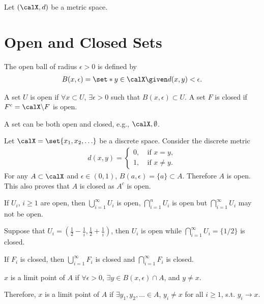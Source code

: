 \documentclass[../aipt.tex]{subfiles}
\begin{document}

Let $(\calX, d)$ be a metric space. 

\section{Open and Closed Sets}
\begin{Definition}
The open ball of radius $\epsilon > 0$ is defined by
\begin{align*}
B(x,\epsilon)=\set*{y \in \calX \given d(x,y)<\epsilon}.
\end{align*}
\end{Definition}

\begin{Definition}
A set $U$ is open if $\forall x \subset U$, $\exists \epsilon >0$ such that $B(x,\epsilon)\subset U$. A set $F$ is closed if $F^c = \calX\backslash F$ is open.
\end{Definition}

A set can be both open and closed, e.g., $\calX, \emptyset$. 

\begin{Example}\label{ex:discrete_X}
Let $\calX=\set{x_1, x_2, \ldots}$ be a discrete space. Consider the discrete metric
\begin{align*}
d(x,y)=\left\{
\begin{array}{ll}
0,&\ \text{if $x=y$}, \\
1,&\ \text{if $x\neq y$}.  
\end{array}\right.
\end{align*}
For any $A \subset \calX$ and $\epsilon\in(0,1)$, $B(a,\epsilon)=\{a\} \subset A$. Therefore $A$ is open. This also proves that $A$ is closed as $A^c$ is open. 
\end{Example}

If $U_i$, $i\geq1$ are open, then $\bigcup_{i=1}^\infty U_i$ is open, $\bigcap_{i=1}^n U_i$ is open but $\bigcap_{i=1}^\infty U_i$ may not be open.

\begin{Example}
Suppose that $U_i=(\frac{1}{2}-\frac{1}{i},\frac{1}{2}+\frac{1}{i})$, then $U_i$ is open while $\bigcap_{i=1}^\infty U_i=\{1/2\}$ is closed.
\end{Example}

If $F_i$ is closed, then $\bigcup_{i=1}^\infty F_i$ is closed and $\bigcap_{i=1}^\infty F_i$ is closed.

\begin{Definition}
$x$ is a limit point of $A$ if $\forall \epsilon >0$, $\exists y \in B(x,\epsilon) \cap A$, and $y\neq x$.
\end{Definition}
Therefore, $x$ is a limit point of $A$ if $\exists y_1,y_2,\ldots \in A$, $y_i\ne x$ for all $i\geq1$, s.t. $y_i \to x$.
\end{document}
